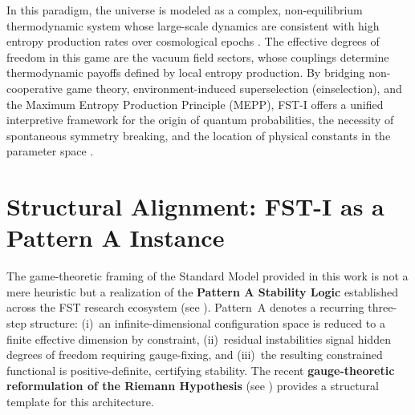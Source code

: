 \documentclass[12pt,a4paper]{article}
\theoremstyle{remark}
\begin{document}
In this paradigm, the universe is modeled as a complex, non-equilibrium thermodynamic system whose large-scale dynamics are consistent with high entropy production rates over cosmological epochs \citep{MEPP2004}. The effective degrees of freedom in this game are the vacuum field sectors, whose couplings determine thermodynamic payoffs defined by local entropy production. By bridging non-cooperative game theory, environment-induced superselection (einselection), and the Maximum Entropy Production Principle (MEPP), FST-I offers a unified interpretive framework for the origin of quantum probabilities, the necessity of spontaneous symmetry breaking, and the location of physical constants in the parameter space \citep{QuantumOptimization,LasryLions2007,HiggsVEV2024}.

\section{Structural Alignment: FST-I as a Pattern A Instance}
\label{sec:structural-alignment}

The game-theoretic framing of the Standard Model provided in this work is not a mere heuristic but a realization of the \textbf{Pattern A Stability Logic} established across the FST research ecosystem (see \cite{FST-Unified2026}). Pattern~A denotes a recurring three-step structure: (i)~an infinite-dimensional configuration space is reduced to a finite effective dimension by constraint, (ii)~residual instabilities signal hidden degrees of freedom requiring gauge-fixing, and (iii)~the resulting constrained functional is positive-definite, certifying stability. The recent \textbf{gauge-theoretic reformulation of the Riemann Hypothesis} (see \cite{GeigerRH2026c}) provides a structural template for this architecture.
\end{document}
